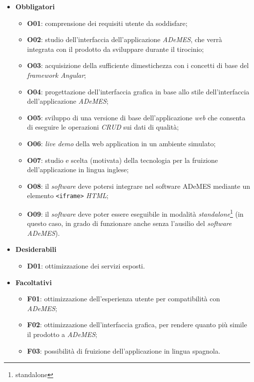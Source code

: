 \begin{itemize}
    \item \textbf{Obbligatori}
        \begin{itemize}
            \item \textbf{O01}: comprensione dei requisiti utente da soddisfare;
            \item \textbf{O02}: studio dell'interfaccia dell'applicazione \textit{ADeMES}, che verrà integrata con il prodotto da sviluppare durante il tirocinio;
            \item \textbf{O03}: acquisizione della sufficiente dimestichezza con i concetti di base del \textit{framework Angular};
            \item \textbf{O04}: progettazione dell'interfaccia grafica in base allo stile dell'interfaccia dell'applicazione \textit{ADeMES};
            \item \textbf{O05}: sviluppo di una versione di base dell'applicazione \textit{web} che consenta di eseguire le operazioni \textit{CRUD} sui dati di qualità;  
            \item \textbf{O06}: \textit{live demo} della web application in un ambiente simulato;
            \item \textbf{O07}: studio e scelta (motivata) della tecnologia per la fruizione dell'applicazione in lingua inglese;
            \item \textbf{O08}: il \textit{software} deve potersi integrare nel software ADeMES mediante un elemento \texttt{<iframe>} \textit{HTML};
            \item \textbf{O09}: il \textit{software} deve poter essere eseguibile in modalità \textit{standalone}\footnote{\gls{standalone}} (in questo caso, in grado di funzionare anche senza l'ausilio del \textit{software ADeMES}).
        \end{itemize}
    \item \textbf{Desiderabili}
        \begin{itemize}
            \item \textbf{D01}: ottimizzazione dei servizi esposti.
        \end{itemize}
    \item \textbf{Facoltativi}
        \begin{itemize}
            \item \textbf{F01}: ottimizzazione dell'esperienza utente per compatibilità con \textit{ADeMES};
            \item \textbf{F02}: ottimizzazione dell'interfaccia grafica, per rendere quanto più simile il prodotto a \textit{ADeMES};
            \item \textbf{F03}: possibilità di fruizione dell'applicazione in lingua spagnola.
        \end{itemize}
\end{itemize}




